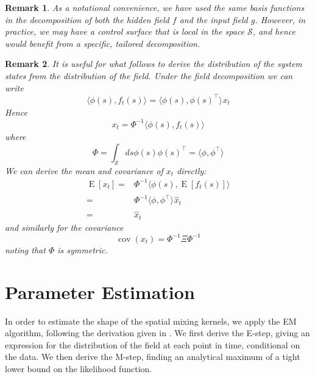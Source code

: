 \documentclass{IEEEtran}
\newcommand{\inner}[3]{\langle#1,#2\rangle_{#3}}
\DeclareMathOperator{\E}{E}
\DeclareMathOperator{\cov}{cov}
\newtheorem{remark}{Remark}
\begin{document}
\begin{remark}
As a notational convenience, we have used the same basis functions in the decomposition of both the hidden field $f$ and the input field $g$. However, in practice, we may have a control surface that is local in the space $\mathcal{S}$, and hence would benefit from a specific, tailored decomposition. 
\end{remark}

\begin{remark}
	It is useful for what follows to derive the distribution of the system states from the distribution of the field. Under the field decomposition we can write
\begin{equation}
	\inner{\phi(s)}{f_t(s)}{} = \inner{\phi(s)}{\phi(s)^\top}{} x_t
\end{equation}
Hence
\begin{equation}
	x_t = \Phi^{-1}\inner{\phi(s)}{f_t(s)}{}
\end{equation}
where
\begin{equation}
		\Phi =  \int_\mathcal{S}ds\phi(s)\phi(s)^\top
 		= \inner{\phi}{\phi^\top}{}
\end{equation}
We can derive the mean and covariance of $x_t$ directly:
\begin{equation}
	\begin{split}
	\E[x_t] = & \Phi^{-1} \inner{\phi(s)}{\E[f_t(s)]}{} \\
	= & \Phi^{-1} \inner{\phi}{\phi^\top}{} \hat{x}_t \\
	= & \hat{x}_t
	\end{split}
\end{equation}
and similarly for the covariance\cite{Scerri09}
\begin{equation}
	\label{eqn:covx}
	\cov(x_t) = \Phi^{-1} \Xi \Phi^{-1}
\end{equation}
noting that $\Phi$ is symmetric.	
\end{remark}

\section{Parameter Estimation}
\label{sec:estimation}

In order to estimate the shape of the spatial mixing kernels, we apply the EM algorithm, following the derivation given in \cite{GibsonNinness}. We first derive the E-step, giving an expression for the distribution of the field at each point in time, conditional on the data. We then derive the M-step, finding an analytical maximum of a tight lower bound on the likelihood function.
\end{document}
